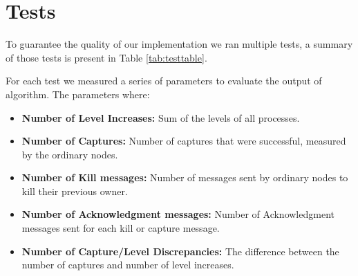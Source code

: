 \section*{Tests}

To guarantee the quality of our implementation we ran multiple tests, a summary of those tests is present in Table \ref{tab:testtable}.

For each test we measured a series of parameters to evaluate the output of algorithm. The parameters where:

\begin{itemize}
\item{\textbf{Number of Level Increases:}} Sum of the levels of all processes. 
\item{\textbf{Number of Captures:}} Number of captures that were successful, measured by the ordinary nodes.
\item{\textbf{Number of Kill messages:}} Number of messages sent by ordinary nodes to kill their previous owner.
\item{\textbf{Number of Acknowledgment messages:}} Number of Acknowledgment messages sent for each kill or capture message.
\item{\textbf{Number of Capture/Level Discrepancies:}} The difference between the number of captures and number of level increases.

\end{itemize}

\begin{table}[h] 
\centering
{}
\caption{Tests summary}\label{tab:testtable}
\end{table}


